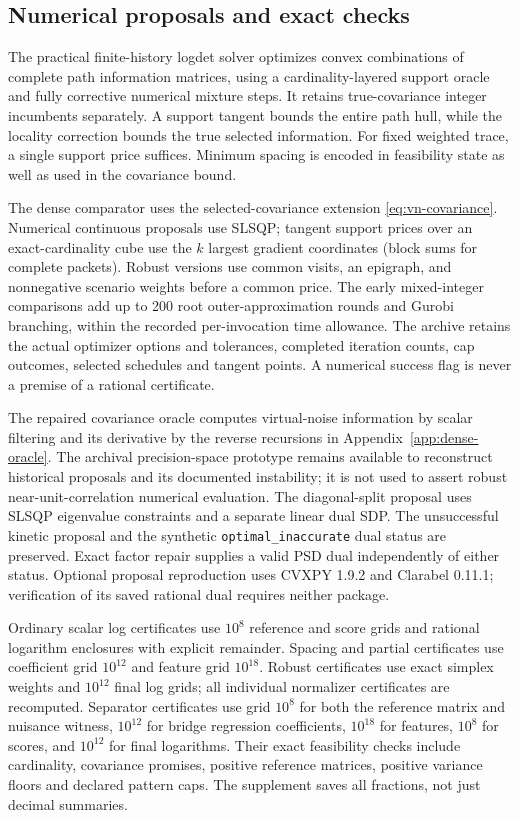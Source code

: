 \subsection{Numerical proposals and exact checks}

The practical finite-history logdet solver optimizes convex combinations of
complete path information matrices, using a cardinality-layered support oracle
and fully corrective numerical mixture steps. It retains true-covariance
integer incumbents separately. A support tangent bounds the entire path hull,
while the locality correction bounds the true selected information. For fixed
weighted trace, a single support price suffices. Minimum spacing is encoded in feasibility state as well as
used in the covariance bound.

The dense comparator uses the selected-covariance extension
\eqref{eq:vn-covariance}. Numerical continuous proposals use SLSQP; tangent
support prices over an exact-cardinality cube use the $k$ largest gradient
coordinates (block sums for complete packets). Robust versions use common
visits, an epigraph, and nonnegative scenario weights before a common price.
The early mixed-integer comparisons add up to 200 root outer-approximation
rounds and Gurobi branching, within the recorded per-invocation time allowance.
The archive retains the actual optimizer options and tolerances, completed
iteration counts, cap outcomes, selected schedules and tangent points.
A numerical success flag is never a premise of a rational certificate.

The repaired covariance oracle computes virtual-noise information by scalar
filtering and its derivative by the reverse recursions in
Appendix~\ref{app:dense-oracle}. The archival precision-space prototype remains
available to reconstruct historical proposals and its documented instability;
it is not used to assert robust near-unit-correlation numerical evaluation.
The diagonal-split proposal uses SLSQP eigenvalue constraints and a separate
linear dual SDP. The unsuccessful kinetic proposal and the synthetic
\texttt{optimal\_inaccurate} dual status are preserved. Exact factor repair
supplies a valid PSD dual independently of either status. Optional proposal
reproduction uses CVXPY 1.9.2 and Clarabel 0.11.1; verification of its saved
rational dual requires neither package.

Ordinary scalar log certificates use $10^8$ reference and score grids and
rational logarithm enclosures with explicit remainder. Spacing and partial
certificates use coefficient grid $10^{12}$ and feature grid $10^{18}$.
Robust certificates use exact simplex weights and $10^{12}$ final log grids;
all individual normalizer certificates are recomputed. Separator certificates
use grid $10^8$ for both the reference matrix and nuisance witness,
$10^{12}$ for bridge regression coefficients, $10^{18}$ for features,
$10^8$ for scores, and $10^{12}$ for final logarithms. Their exact feasibility
checks include cardinality, covariance promises, positive reference matrices,
positive variance floors and declared pattern caps. The supplement saves
all fractions, not just decimal summaries.

